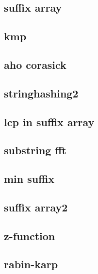 \subsection{suffix array}
\raggedbottom
\hrulefill
\subsection{kmp}
\raggedbottom
\hrulefill
\subsection{aho corasick}
\raggedbottom
\hrulefill
\subsection{stringhashing2}
\raggedbottom
\hrulefill
\subsection{lcp in suffix array}
\raggedbottom
\hrulefill
\subsection{substring fft}
\raggedbottom
\hrulefill
\subsection{min suffix}
\raggedbottom
\hrulefill
\subsection{suffix array2}
\raggedbottom
\hrulefill
\subsection{z-function}
\raggedbottom
\hrulefill
\subsection{rabin-karp}
\raggedbottom
\hrulefill
